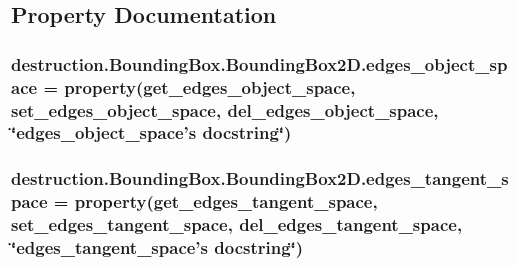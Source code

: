 \subsection{Property Documentation}
\hypertarget{classdestruction_1_1_bounding_box_1_1_bounding_box2_d_a7419ebda7a180604694364051edadd4e}{
\subsubsection[{edges\-\_\-object\-\_\-space}]{\setlength{\rightskip}{0pt plus 5cm}destruction.\-Bounding\-Box.\-Bounding\-Box2\-D.\-edges\-\_\-object\-\_\-space = property({\bf get\-\_\-edges\-\_\-object\-\_\-space}, {\bf set\-\_\-edges\-\_\-object\-\_\-space}, {\bf del\-\_\-edges\-\_\-object\-\_\-space}, \char`\"{}edges\-\_\-object\-\_\-space's docstring\char`\"{})\hspace{0.3cm}{\ttfamily [static]}}}\label{classdestruction_1_1_bounding_box_1_1_bounding_box2_d_a7419ebda7a180604694364051edadd4e}
\hypertarget{classdestruction_1_1_bounding_box_1_1_bounding_box2_d_a854b3e69416c0ee9b1a66e8f0c0c4c6c}{
\subsubsection[{edges\-\_\-tangent\-\_\-space}]{\setlength{\rightskip}{0pt plus 5cm}destruction.\-Bounding\-Box.\-Bounding\-Box2\-D.\-edges\-\_\-tangent\-\_\-space = property({\bf get\-\_\-edges\-\_\-tangent\-\_\-space}, {\bf set\-\_\-edges\-\_\-tangent\-\_\-space}, {\bf del\-\_\-edges\-\_\-tangent\-\_\-space}, \char`\"{}edges\-\_\-tangent\-\_\-space's docstring\char`\"{})\hspace{0.3cm}{\ttfamily [static]}}}\label{classdestruction_1_1_bounding_box_1_1_bounding_box2_d_a854b3e69416c0ee9b1a66e8f0c0c4c6c}
